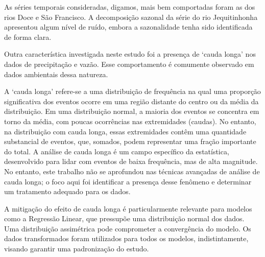 As séries temporais consideradas, digamos, mais bem comportadas foram as dos rios Doce e São Francisco. A decomposição sazonal da série do rio Jequitinhonha apresentou algum nível de ruído, embora a sazonalidade tenha sido identificada de forma clara.

%

Outra característica investigada neste estudo foi a presença de `cauda longa' nos dados de precipitação e vazão. Esse comportamento é comumente observado em dados ambientais dessa natureza.\cite{elena_macdonald_2023}

A `cauda longa' refere-se a uma distribuição de frequência na qual uma proporção significativa dos eventos ocorre em uma região distante do centro ou da média da distribuição. Em uma distribuição normal, a maioria dos eventos se concentra em torno da média, com poucas ocorrências nas extremidades (caudas). No entanto, na distribuição com cauda longa, essas extremidades contêm uma quantidade substancial de eventos, que, somados, podem representar uma fração importante do total. A análise de cauda longa é um campo específico da estatística, desenvolvido para lidar com eventos de baixa frequência, mas de alta magnitude. No entanto, este trabalho não se aprofundou nas técnicas avançadas de análise de cauda longa; o foco aqui foi identificar a presença desse fenômeno e determinar um tratamento adequado para os dados.

A mitigação do efeito de cauda longa é particularmente relevante para modelos como a Regressão Linear, que pressupõe uma distribuição normal dos dados. Uma distribuição assimétrica pode comprometer a convergência do modelo. Os dados transformados foram utilizados para todos os modelos, indistintamente, visando garantir uma padronização do estudo.

